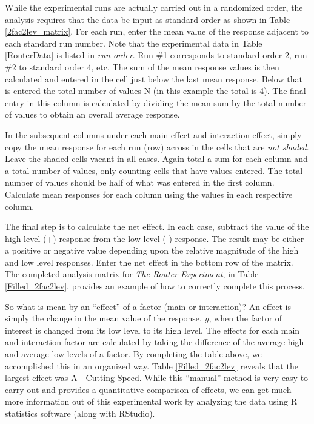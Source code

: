 \begin{center}
	
\end{center}

While the experimental runs are actually carried out in a randomized order, the analysis requires that the data be input as standard order as shown in Table \ref{2fac2lev_matrix}. For each run, enter the mean value of the response adjacent to each standard run number.  Note that the experimental data in Table \ref{RouterData} is listed in \textit{run order}. Run \#1 corresponds to standard order 2, run \#2 to standard order 4, etc. The sum of the mean response values is then calculated and entered in the cell just below the last mean response.  Below that is entered the total number of values N (in this example the total is 4). The final entry in this column is calculated by dividing the mean sum by the total number of values to obtain an overall average response.

In the subsequent columns under each main effect and interaction effect, simply copy the mean response for each run (row) across in the cells that are \textit{not shaded}.  Leave the shaded cells vacant in all cases. Again total a sum for each column and a total number of values, only counting cells that have values entered.  The total number of values should be half of what was entered in the first column.  Calculate mean responses for each column using the values in each respective column.

The final step is to calculate the net effect.  In each case, subtract the value of the high level (+) response from the low level (-) response.  The result may be either a positive or negative value depending upon the relative magnitude of the high and low level responses.  Enter the net effect in the  bottom row of the matrix.  The completed analysis matrix for \textit{The Router Experiment}, in Table \ref{Filled_2fac2lev}, provides an example of how to correctly complete this process.




So what is mean by an ``effect'' of a factor (main or interaction)?  An effect is simply the change in the mean value of the response, $y$, when the factor of interest is changed from its low level to its high level.  The effects for each main and interaction factor are calculated by taking the difference of the average high and average low levels of a factor. By completing the table above, we accomplished this in an organized way. Table \ref{Filled_2fac2lev} reveals that the largest effect was A - Cutting Speed. While this ``manual'' method is very easy to carry out and provides a quantitative comparison of effects, we can get much more information out of this experimental work by analyzing the data using R statistics software (along with RStudio).

